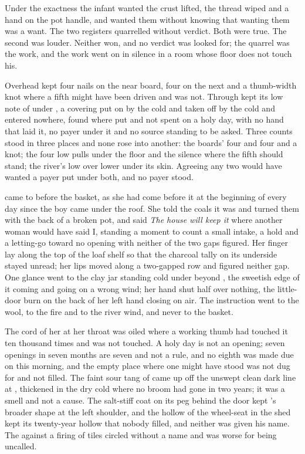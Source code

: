 Under the exactness the infant wanted the crust lifted, the thread wiped and a hand on the pot handle, and wanted them without knowing that wanting them was a want. The two registers quarrelled without verdict. Both were true. The second was louder. Neither won, and no verdict was looked for; the quarrel was the work, and the work went on in silence in a room whose floor does not touch his.

Overhead  kept four nails on the near board, four on the next and a thumb-width knot where a fifth might have been driven and was not. Through   kept its low note of  under , a covering put on by the cold and taken off by the cold and entered nowhere, found where put and not spent on a holy day, with no hand that laid it, no payer under it and no source standing to be asked. Three counts stood in three places and none rose into another: the boards' four and four and a knot; the four low pulls under the floor and the silence where the fifth should stand; the river's low over lower under its skin. Agreeing any two would have wanted a payer put under both, and no payer stood.

 came to  before the basket, as she had come before it at the beginning of every day since the boy came under the roof. She told the coals it was  and turned them with the back of a broken pot, and said \emph{The house will keep it} where another woman would have said I, standing a moment to count a small intake, a hold and a letting-go toward no opening with neither of the two gaps figured. Her finger lay along the top of the loaf shelf so that the charcoal tally on its underside stayed unread; her lips moved along a two-gapped row and figured neither gap. One glance went to the clay jar standing cold under  beyond , the sweetish edge of it coming and going on a wrong wind; her hand shut half over nothing, the little-door burn on the back of her left hand closing on air. The instruction went to the wool, to the fire and to the river wind, and never to the basket.

The cord of her  at her throat was oiled where a working thumb had touched it ten thousand times and was not touched. A holy day is not an opening; seven openings in seven months are seven and not a rule, and no eighth was made due on this morning, and the empty place where one might have stood was not dug for and not filled. The faint sour tang of  came up off the unswept clean dark line at , thickened in the dry cold where no broom had gone in two years; it was a smell and not a cause. The salt-stiff coat on its peg behind the door kept 's broader shape at the left shoulder, and the hollow of the wheel-seat in the shed kept its twenty-year hollow that nobody filled, and neither was given his name. The  against a firing of tiles circled without a name and was worse for being uncalled.

